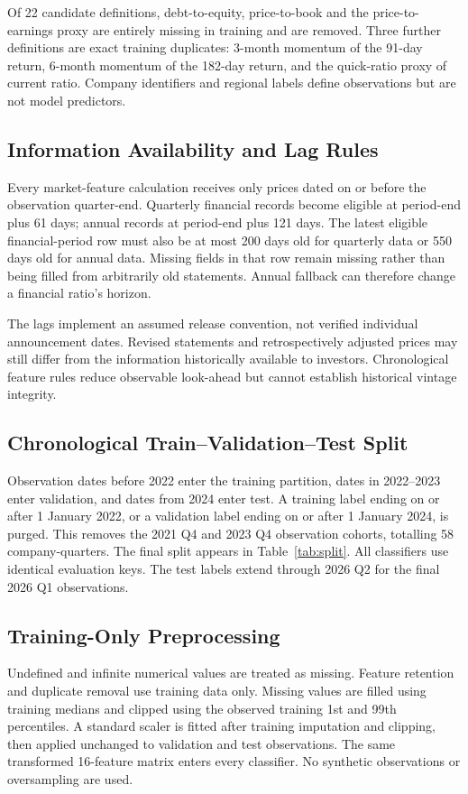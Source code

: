 \documentclass[letterpaper,10pt,conference]{ieeeconf}
\begin{document}
Of 22 candidate definitions, debt-to-equity, price-to-book and the price-to-earnings proxy are entirely missing in training and are removed. Three further definitions are exact training duplicates: 3-month momentum of the 91-day return, 6-month momentum of the 182-day return, and the quick-ratio proxy of current ratio. Company identifiers and regional labels define observations but are not model predictors.

\subsection{Information Availability and Lag Rules}
Every market-feature calculation receives only prices dated on or before the observation quarter-end. Quarterly financial records become eligible at period-end plus 61 days; annual records at period-end plus 121 days. The latest eligible financial-period row must also be at most 200 days old for quarterly data or 550 days old for annual data. Missing fields in that row remain missing rather than being filled from arbitrarily old statements. Annual fallback can therefore change a financial ratio's horizon.

The lags implement an assumed release convention, not verified individual announcement dates. Revised statements and retrospectively adjusted prices may still differ from the information historically available to investors. Chronological feature rules reduce observable look-ahead but cannot establish historical vintage integrity.

\subsection{Chronological Train--Validation--Test Split}
Observation dates before 2022 enter the training partition, dates in 2022--2023 enter validation, and dates from 2024 enter test. A training label ending on or after 1 January 2022, or a validation label ending on or after 1 January 2024, is purged. This removes the 2021 Q4 and 2023 Q4 observation cohorts, totalling 58 company-quarters. The final split appears in Table~\ref{tab:split}. All classifiers use identical evaluation keys. The test labels extend through 2026 Q2 for the final 2026 Q1 observations.

\subsection{Training-Only Preprocessing}
Undefined and infinite numerical values are treated as missing. Feature retention and duplicate removal use training data only. Missing values are filled using training medians and clipped using the observed training 1st and 99th percentiles. A standard scaler is fitted after training imputation and clipping, then applied unchanged to validation and test observations. The same transformed 16-feature matrix enters every classifier. No synthetic observations or oversampling are used.
\end{document}
